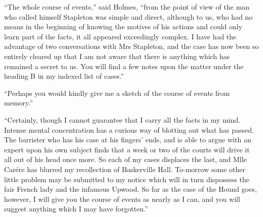 \documentclass[paper=5.5in:8.5in,BCOR=7mm,twoside,DIV=calc,12pt,usegeometry,openany,chapterprefix,endperiod]{scrbook} %
\begin{document}


\enquote{The whole course of events,} said Holmes, \enquote{from the point of view of the man who called himself Stapleton was simple and direct, although to us, who had no means in the beginning of knowing the motives of his actions and could only learn part of the facts, it all appeared exceedingly complex. I have had the advantage of two conversations with Mrs Stapleton, and the case has now been so entirely cleared up that I am not aware that there is anything which has remained a secret to us. You will find a few notes upon the matter under the heading B in my indexed list of cases.}

\enquote{Perhaps you would kindly give me a sketch of the course of events from memory.}

\enquote{Certainly, though I cannot guarantee that I carry all the facts in my mind. Intense mental concentration has a curious way of blotting out what has passed. The barrister who has his case at his fingers' ends, and is able to argue with an expert upon his own subject finds that a week or two of the courts will drive it all out of his head once more. So each of my cases displaces the last, and Mlle Carére has blurred my recollection of Baskerville Hall. To-morrow some other little problem may be submitted to my notice which will in turn dispossess the fair French lady and the infamous Upwood. So far as the case of the Hound goes, however, I will give you the course of events as nearly as I can, and you will suggest anything which I may have forgotten.}
\end{document}
